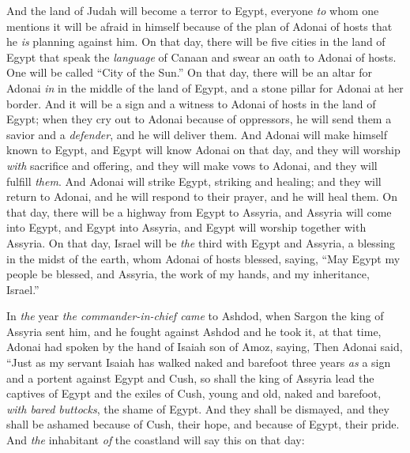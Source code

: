\begin{biblechapter}
\verse And the land of Judah will become a terror to Egypt, everyone \textit{to} whom one mentions it will be afraid in himself because of the plan of Adonai of hosts that he \textit{is} planning against him.
\verse On that day, there will be five cities in the land of Egypt that speak the \textit{language} of Canaan and swear an oath to Adonai of hosts. One will be called “City of the Sun.”
\verse On that day, there will be an altar for Adonai \textit{in} in the middle of the land of Egypt, and a stone pillar for Adonai at her border.
\verse And it will be a sign and a witness to Adonai of hosts in the land of Egypt; when they cry out to Adonai because of oppressors, he will send them a savior and a \textit{defender}, and he will deliver them.
\verse And Adonai will make himself known to Egypt, and Egypt will know Adonai on that day, and they will worship \textit{with} sacrifice and offering, and they will make vows to Adonai, and they will fulfill \textit{them}.
\verse And Adonai will strike Egypt, striking and healing; and they will return to Adonai, and he will respond to their prayer, and he will heal them.
\verse On that day, there will be a highway from Egypt to Assyria, and Assyria will come into Egypt, and Egypt into Assyria, and Egypt will worship together with Assyria.
\verse On that day, Israel will be \textit{the} third with Egypt and Assyria, a blessing in the midst of the earth,
\verse whom Adonai of hosts blessed, saying, “May Egypt my people be blessed, and Assyria, the work of my hands, and my inheritance, Israel.”
\end{biblechapter}

\begin{biblechapter} %
 In \textit{the} year \textit{the commander-in-chief came} to Ashdod, when Sargon the king of Assyria sent him, and he fought against Ashdod and he took it,
\verse at that time, Adonai had spoken by the hand of Isaiah son of Amoz, saying,
\verse Then Adonai said, “Just as my servant Isaiah has walked naked and barefoot three years \textit{as} a sign and a portent against Egypt and Cush,
\verse so shall the king of Assyria lead the captives of Egypt and the exiles of Cush, young and old, naked and barefoot, \textit{with bared buttocks}, the shame of Egypt.
\verse And they shall be dismayed, 
and they shall be ashamed 
because of Cush, their hope, 
and because of Egypt, their pride.
\verse And \textit{the} inhabitant \textit{of} the coastland will say this on that day:
\end{biblechapter}

